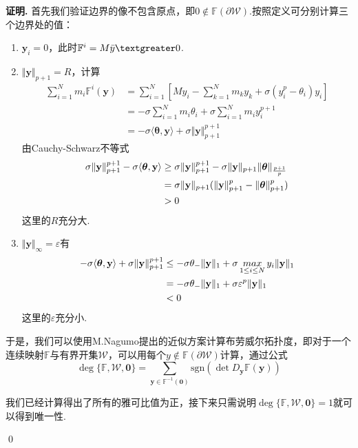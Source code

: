 \documentclass[11pt,a4paper]{article}
\newcommand{\sign}[1]{\mathrm{sgn}(#1)}%
\theoremstyle{definition}
\renewenvironment{proof}{\par\textbf{证明.}\;}{\qed\par}
\begin{document}
\begin{proof}
		首先我们验证边界的像不包含原点，即$0\notin\mathbb{F(\partial\mathcal{W})}$.按照定义可分别计算三个边界处的值：
		\begin{enumerate}[(1)]
			\item $\textbf{y}_{i}=0$，此时$\mathbb{F}^{i}=M\bar{y}\textgreater0$.
			\item $\Vert\textbf{y}\Vert_{p+1}=R$，计算
			\begin{align*}
				\sum_{i=1}^{N}m_{i}\mathbb{F}^{i}(\textbf{y})
				&=\sum_{i=1}^{N}[My_{i}-\sum_{k=1}^{N}m_{k}y_{k}+\sigma(y_{i}^{p}-\theta_{i})y_{i}]\\
				&=-\sigma\sum_{i=1}^{N} m_{i}\theta_{i}+\sigma\sum_{i=1}^{N}m_{i}y_{i}^{p+1}\\
				&=-\sigma\langle\bm{\theta},\textbf{y}\rangle+\sigma\Vert\textbf{y}\Vert_{p+1}^{p+1}
			\end{align*}由Cauchy-Schwarz不等式
			\begin{align*}
				\sigma\Vert\textbf{y}\Vert_{p+1}^{p+1}-\sigma\langle\bm{\theta},\textbf{y}\rangle
				&\geq \sigma\Vert\textbf{y}\Vert_{p+1}^{p+1}-\sigma\Vert\textbf{y}\Vert_{p+1}\Vert\bm{\theta}\Vert_{\frac{p+1}{p}}\\
				&=\sigma\Vert\textbf{y}\Vert_{p+1}(\Vert\textbf{y}\Vert_{p+1}^{p}-\Vert\bm{\theta}\Vert_{p+1}^{p})\\
				&\textgreater0
			\end{align*}
			这里的$R$充分大.
			\item $\Vert\textbf{y}\Vert_{\infty}=\varepsilon$有
			\begin{align*}
				-\sigma\langle\bm{\theta},\textbf{y}\rangle+\sigma\Vert\textbf{y}\Vert_{p+1}^{p+1}
				&\leq-\sigma\theta_{-}\Vert\textbf{y}\Vert_{1}+\sigma\mathop{max}\limits_{1\leq i\leq N}y_{i}\Vert\textbf{y}\Vert_{1}\\
				&=-\sigma\theta_{-}\Vert\textbf{y}\Vert_{1}+\sigma\varepsilon^{p}\Vert\textbf{y}\Vert_{1}\\
				&\textless0
			\end{align*}
			这里的$\varepsilon$充分小.
		\end{enumerate}
		
			于是，我们可以使用M.Nagumo提出的近似方案\cite{ref4}计算布劳威尔拓扑度，即对于一个连续映射$\mathbb{F}$与有界开集$\mathcal{W}$，可以用每个$y\notin\mathbb{F}(\partial\mathcal{W})$计算，通过公式\[ \deg\{\mathbb{F},\mathcal{W},\textbf{0}\}=\sum_{\textbf{y}\in\mathbb{F}^{-1}(\textbf{0})}\sign{\det D_{\textbf{y}}\mathbb{F}(\textbf{y})} \]
			
			我们已经计算得出了所有的雅可比值为正，接下来只需说明$\deg\{\mathbb{F},\mathcal{W},\textbf{0}\}=1$就可以得到唯一性.
			

\end{proof}
\end{document}
